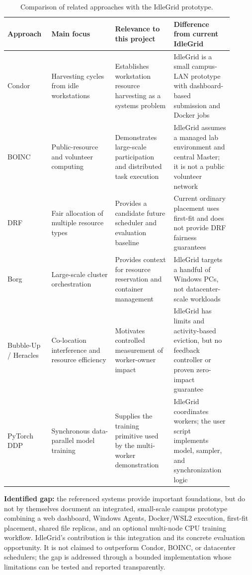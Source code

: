 \documentclass{article}
\begin{document}
\begin{table}[h!]
\centering
\caption{Comparison of related approaches with the IdleGrid prototype.}
\label{tab:related-work}
\begin{tabular}{|p{0.16\linewidth}|p{0.26\linewidth}|p{0.24\linewidth}|p{0.24\linewidth}|}
\hline
Approach & Main focus & Relevance to this project & Difference from current IdleGrid \\
\hline
Condor \cite{condor} & Harvesting cycles from idle workstations & Establishes workstation resource harvesting as a systems problem & IdleGrid is a small campus-LAN prototype with dashboard-based submission and Docker jobs \\
\hline
BOINC \cite{boinc} & Public-resource and volunteer computing & Demonstrates large-scale participation and distributed task execution & IdleGrid assumes a managed lab environment and central Master; it is not a public volunteer network \\
\hline
DRF \cite{drf} & Fair allocation of multiple resource types & Provides a candidate future scheduler and evaluation baseline & Current ordinary placement uses first-fit and does not provide DRF fairness guarantees \\
\hline
Borg \cite{borg} & Large-scale cluster orchestration & Provides context for resource reservation and container management & IdleGrid targets a handful of Windows PCs, not datacenter-scale workloads \\
\hline
Bubble-Up / Heracles \cite{bubbleup,heracles} & Co-location interference and resource efficiency & Motivates controlled measurement of worker-owner impact & IdleGrid has limits and activity-based eviction, but no feedback controller or proven zero-impact guarantee \\
\hline
PyTorch DDP \cite{pytorchddp} & Synchronous data-parallel model training & Supplies the training primitive used by the multi-worker demonstration & IdleGrid coordinates workers; the user script implements model, sampler, and synchronization logic \\
\hline
\end{tabular}
\end{table}

\textbf{Identified gap:} the referenced systems provide important foundations, but do not by themselves document an integrated, small-scale campus prototype combining a web dashboard, Windows Agents, Docker/WSL2 execution, first-fit placement, shared file replicas, and an optional multi-node CPU training workflow. IdleGrid's contribution is this integration and its concrete evaluation opportunity. It is not claimed to outperform Condor, BOINC, or datacenter schedulers; the gap is addressed through a bounded implementation whose limitations can be tested and reported transparently.
\end{document}
